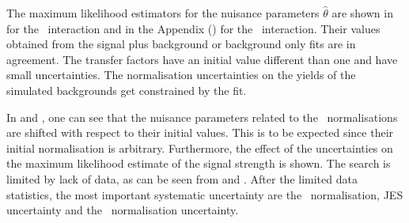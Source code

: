 The maximum likelihood estimators for the nuisance parameters $\hat{\theta}$ are shown in  for the \Zct\ interaction and in the Appendix () for the \Zut\ interaction. Their values obtained from the signal plus background or background only fits are in agreement. The transfer factors have an initial value different than one and have small uncertainties. The normalisation uncertainties on the yields of the simulated backgrounds get constrained by the fit.  %

 In  and , one can see that the nuisance parameters related to the \NPL\ normalisations are shifted with respect to their initial values. This is to be expected since their initial  normalisation is arbitrary. Furthermore, the effect of the uncertainties on the maximum likelihood estimate of the signal strength is shown. The search is limited by lack of data, as can be seen from  and . After the limited data statistics, the most important systematic uncertainty are the \ttZ\ normalisation, JES uncertainty and the \NPL\ normalisation uncertainty. 
 
 

